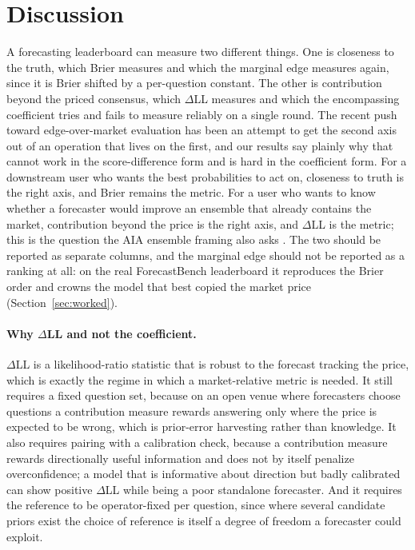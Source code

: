 \documentclass[11pt]{article}
\begin{document}
\section{Discussion}
\label{sec:discussion}
A forecasting leaderboard can measure two different things. One is closeness to the truth, which Brier measures and which the marginal edge measures again, since it is Brier shifted by a per-question constant. The other is contribution beyond the priced consensus, which $\Delta$LL measures and which the encompassing coefficient tries and fails to measure reliably on a single round. The recent push toward edge-over-market evaluation has been an attempt to get the second axis out of an operation that lives on the first, and our results say plainly why that cannot work in the score-difference form and is hard in the coefficient form. For a downstream user who wants the best probabilities to act on, closeness to truth is the right axis, and Brier remains the metric. For a user who wants to know whether a forecaster would improve an ensemble that already contains the market, contribution beyond the price is the right axis, and $\Delta$LL is the metric; this is the question the AIA ensemble framing also asks \citep{alur2025}. The two should be reported as separate columns, and the marginal edge should not be reported as a ranking at all: on the real ForecastBench leaderboard it reproduces the Brier order and crowns the model that best copied the market price (Section~\ref{sec:worked}).

\paragraph{Why $\Delta$LL and not the coefficient.} $\Delta$LL is a likelihood-ratio statistic that is robust to the forecast tracking the price, which is exactly the regime in which a market-relative metric is needed. It still requires a fixed question set, because on an open venue where forecasters choose questions a contribution measure rewards answering only where the price is expected to be wrong, which is prior-error harvesting rather than knowledge. It also requires pairing with a calibration check, because a contribution measure rewards directionally useful information and does not by itself penalize overconfidence; a model that is informative about direction but badly calibrated can show positive $\Delta$LL while being a poor standalone forecaster. And it requires the reference to be operator-fixed per question, since where several candidate priors exist the choice of reference is itself a degree of freedom a forecaster could exploit.
\end{document}
